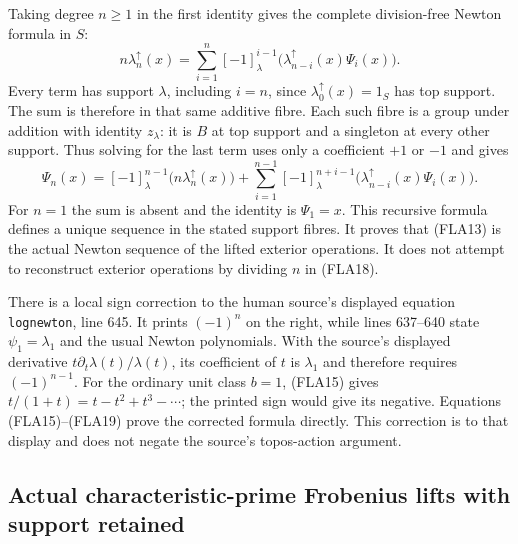 Taking degree $n\ge1$ in the first identity gives the complete
division-free Newton formula in $S$:
\begin{equation}\tag{FLA18}
 n\lambda_n^{\uparrow}(x)
   =\sum_{i=1}^n[-1]^{i-1}_\lambda
       \bigl(\lambda_{n-i}^{\uparrow}(x)\Psi_i(x)\bigr).
\end{equation}
Every term has support $\lambda$, including $i=n$, since
$\lambda_0^{\uparrow}(x)=1_S$ has top support. The sum is
therefore in that same additive fibre. Each such fibre is a group
under addition with identity $z_\lambda$: it is $B$ at top
support and a singleton at every other support. Thus solving for
the last term uses only a coefficient $+1$ or $-1$ and gives
\begin{equation}\tag{FLA19}
 \Psi_n(x)=[-1]^{n-1}_\lambda
                  \bigl(n\lambda_n^{\uparrow}(x)\bigr)
  +\sum_{i=1}^{n-1}[-1]^{n+i-1}_\lambda
       \bigl(\lambda_{n-i}^{\uparrow}(x)\Psi_i(x)\bigr).
\end{equation}
For $n=1$ the sum is absent and the identity is $\Psi_1=x$.
This recursive formula defines a unique sequence in the stated
support fibres. It proves that (FLA13) is the actual Newton
sequence of the lifted exterior operations. It does not attempt
to reconstruct exterior operations by dividing $n$ in (FLA18).

There is a local sign correction to the human source's displayed
equation \texttt{lognewton}, line 645. It prints $(-1)^n$ on the
right, while lines 637--640 state $\psi_1=\lambda_1$ and the usual
Newton polynomials. With the source's displayed derivative
$t\partial_t\lambda(t)/\lambda(t)$, its coefficient of $t$ is
$\lambda_1$ and therefore requires $(-1)^{n-1}$. For the ordinary
unit class $b=1$, (FLA15) gives $t/(1+t)=t-t^2+t^3-\cdots$;
the printed sign would give its negative. Equations (FLA15)--(FLA19)
prove the corrected formula directly. This correction is to that
display and does not negate the source's topos-action argument.

\subsection{Actual characteristic-prime Frobenius lifts with support retained}

